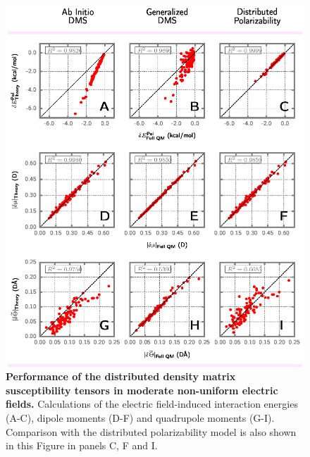 \documentclass[aip,amsmath,amssymb,reprint,floatfix]{revtex4-1}
\begin{document}
\begin{figure}[h]
\includegraphics[width=\textwidth]{data/dmatpol/water/figure1/fig-1.eps}
\caption{\label{f:results} {\bf Performance of the distributed density matrix susceptibility tensors in moderate
non\hyp{}uniform electric fields.}
Calculations of the electric field\hyp{}induced interaction energies (A-C), dipole moments (D-F) and
quadrupole moments (G-I). Comparison with the distributed polarizability model is also shown in this Figure
in panels C, F and I.}
\end{figure}
%
\end{document}
